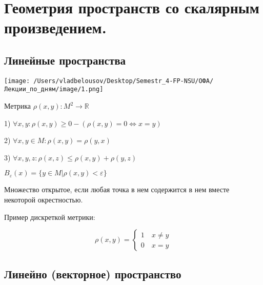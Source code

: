 \documentclass[12pt, a4paper]{report}
\begin{document}
\fi


\chapter{Геометрия пространств со скалярным произведением.}

\section{Линейные пространства}

\begin{center}
    \texttt{[image: /Users/vladbelousov/Desktop/Semestr\_4-FP-NSU/ОФА/Лекции\_по\_дням/image/1.png]}
\end{center}

\begin{definition}
    Метрика \( \rho (x,y): M ^2 \to  \mathbb{R} \) 

    1) \( \forall x,y :\rho (x,y ) \geq 0 - ( \rho(x,y) = 0 \Leftrightarrow x=y)   \) 

    2) \( \forall x,y \in  M :\rho(x,y )= \rho (y,x)  \)
    
    3) \( \forall x,y,z :\rho(x,z) \le  \rho(x,y)+\rho(y,z) \)
\end{definition}

\( B_{\varepsilon}(x) = \{ y \in  M | \rho(x,y) < \varepsilon \} \) 

\begin{definition}
    Множество открытое, если любая точка в нем содержится в нем вместе некоторой окрестностью.
\end{definition}

Пример дискреткой метрики: 

\[ 
\rho(x,y) = 
\begin{cases} 
    1 \quad x \neq y \\
    0 \quad  x=y   
\end{cases} 
\] 

\section{Линейно (векторное) пространство}
\end{document}
